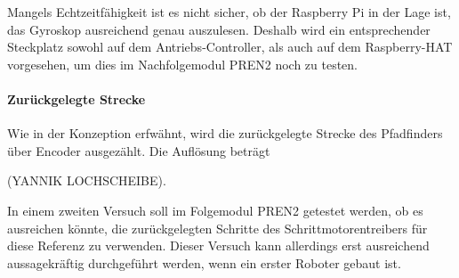 \documentclass[main.tex]{subfiles} %
\begin{document}
Mangels Echtzeitfähigkeit ist es nicht sicher, ob der Raspberry Pi in der Lage
ist, das Gyroskop ausreichend genau auszulesen. Deshalb wird ein entsprechender
Steckplatz sowohl auf dem Antriebs-Controller, als auch auf dem Raspberry-HAT
vorgesehen, um dies im Nachfolgemodul PREN2 noch zu testen.

\paragraph{Zurückgelegte Strecke}
Wie in der Konzeption erfwähnt, wird die zurückgelegte Strecke des Pfadfinders
über Encoder ausgezählt. Die Auflösung beträgt

(YANNIK LOCHSCHEIBE).

In einem zweiten Versuch soll im Folgemodul PREN2 getestet werden, ob es
ausreichen könnte, die zurückgelegten Schritte des Schrittmotorentreibers für
diese Referenz zu verwenden. Dieser Versuch kann allerdings erst ausreichend
aussagekräftig durchgeführt werden, wenn ein erster Roboter gebaut ist.
\end{document}
